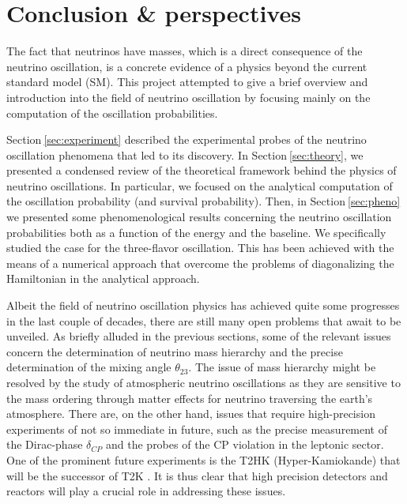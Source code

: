 \documentclass[twocolumn,secnumarabic,amssymb, nobibnotes, aps, prd,10pt]{revtex4-1}
\newcommand{\Sec}[1]{Section$\:$\ref{#1}}
\begin{document}
\section{Conclusion \& perspectives}
\label{sec:conclusion}

The fact that neutrinos have masses, which is a direct consequence of the neutrino oscillation,
is a concrete evidence of a physics beyond the current standard model (SM). This project attempted
to give a brief overview and introduction into the field of neutrino oscillation by focusing
mainly on the computation of the oscillation probabilities.

\Sec{sec:experiment} described the experimental probes of the neutrino oscillation phenomena that
led to its discovery. In \Sec{sec:theory}, we presented a condensed review of the theoretical 
framework behind the physics of neutrino oscillations. In particular, we focused on the analytical
computation of the oscillation probability (and survival probability). Then, in \Sec{sec:pheno} we 
presented some phenomenological results concerning the neutrino oscillation probabilities both as
a function of the energy and the baseline. We specifically studied the case for the three-flavor
oscillation. This has been achieved with the means of a numerical approach that overcome the problems
of diagonalizing the Hamiltonian in the analytical approach.

Albeit the field of neutrino oscillation physics has achieved quite some progresses in the last couple of 
decades, there are still many open problems that await to be unveiled. As briefly alluded in the
previous sections, some of the relevant issues concern the determination of neutrino mass 
hierarchy and the precise determination of the mixing angle $\theta_{23}$. The issue of mass
hierarchy might be resolved by the study of atmospheric neutrino oscillations as they are sensitive
to the mass ordering through matter effects for neutrino traversing the earth's atmosphere.
There are, on the other hand, issues that require high-precision experiments of not so immediate in future, such as the precise measurement of the Dirac-phase $\delta_{CP}$ and the probes of the CP violation in the leptonic sector. One of the prominent future experiments is the T2HK (Hyper-Kamiokande) that will be the successor of T2K \cite{Bellini:2013wra}. It is thus clear that high precision detectors
and reactors will play a crucial role in addressing these issues.



\end{document}

